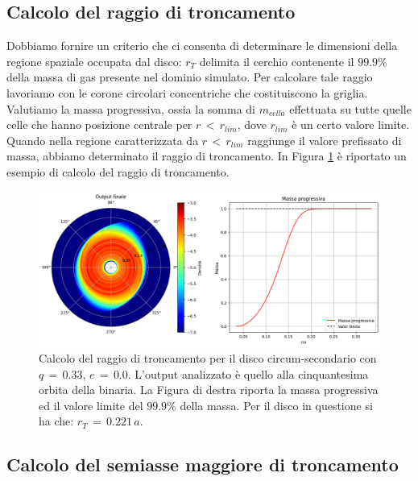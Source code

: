\subsection{Calcolo del raggio di troncamento}

Dobbiamo fornire un criterio che ci consenta di determinare le dimensioni della regione spaziale occupata dal disco: $r_T$ delimita il cerchio contenente il $99.9 \%$ della massa di gas presente nel dominio simulato. Per calcolare tale raggio lavoriamo con le corone circolari concentriche che costituiscono la griglia. Valutiamo la massa progressiva, ossia la somma di $m_{cella}$ effettuata su tutte quelle celle che hanno posizione centrale per $r\,<\,r_{lim}$, dove $r_{lim}$ è un certo valore limite. Quando nella regione caratterizzata da $r\,<\,r_{lim}$ raggiunge il valore prefissato di massa, abbiamo determinato il raggio di troncamento. In Figura \ref{fig:cal_tr} è riportato un esempio di calcolo del raggio di troncamento.

\begin{figure}[H]
    \centering
    \includegraphics[width=\textwidth]{Immagini/Simulazioni/cal_rt.png}
    \caption{Calcolo del raggio di troncamento per il disco circum-secondario con $q\,=\,0.33$, $e\,=\,0.0$. L'output analizzato è quello alla cinquantesima orbita della binaria. La Figura di destra riporta la massa progressiva ed il valore limite del $99.9\%$ della massa. Per il disco in questione si ha che: $r_T\,=\,0.221\,a$.}
    \label{fig:cal_tr}
\end{figure}

\subsection{Calcolo del semiasse maggiore di troncamento}

